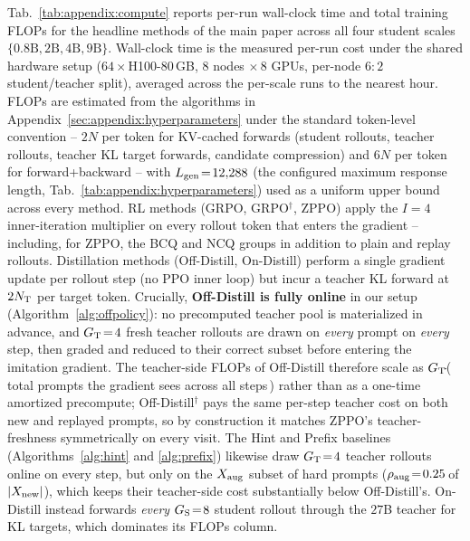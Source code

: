 \documentclass{llmxive}
\begin{document}
Tab.~\ref{tab:appendix:compute} reports per-run wall-clock time and total training FLOPs for the headline methods of the main paper across all four student scales $\{0.8\text{B},2\text{B},4\text{B},9\text{B}\}$. Wall-clock time is the measured per-run cost under the shared hardware setup ($64\!\times\!$H100-$80$\,GB, $8$ nodes $\times\,8$ GPUs, per-node $6\!:\!2$ student/teacher split), averaged across the per-scale runs to the nearest hour. FLOPs are estimated from the algorithms in Appendix~\ref{sec:appendix:hyperparameters} under the standard token-level convention -- $2N$ per token for KV-cached forwards (student rollouts, teacher rollouts, teacher KL target forwards, candidate compression) and $6N$ per token for forward+backward -- with $L_{\rm gen}\!=\!12{,}288$ (the configured maximum response length, Tab.~\ref{tab:appendix:hyperparameters}) used as a uniform upper bound across every method. RL methods (GRPO, GRPO$^{\dagger}$, ZPPO) apply the $I\!=\!4$ inner-iteration multiplier on every rollout token that enters the gradient -- including, for ZPPO, the BCQ and NCQ groups in addition to plain and replay rollouts. Distillation methods (Off-Distill, On-Distill) perform a single gradient update per rollout step (no PPO inner loop) but incur a teacher KL forward at $2N_{\rm T}$ per target token. Crucially, \textbf{Off-Distill is fully online} in our setup (Algorithm~\ref{alg:offpolicy}): no precomputed teacher pool is materialized in advance, and $G_{\rm T}\!=\!4$ fresh teacher rollouts are drawn on \emph{every} prompt on \emph{every} step, then graded and reduced to their correct subset before entering the imitation gradient. The teacher-side FLOPs of Off-Distill therefore scale as $G_{\rm T}\!\cdot\!$(\,total prompts the gradient sees across all steps\,) rather than as a one-time amortized precompute; Off-Distill$^{\dagger}$ pays the same per-step teacher cost on both new and replayed prompts, so by construction it matches ZPPO's teacher-freshness symmetrically on every visit. The Hint and Prefix baselines (Algorithms~\ref{alg:hint} and \ref{alg:prefix}) likewise draw $G_{\rm T}\!=\!4$ teacher rollouts online on every step, but only on the $X_{\rm aug}$ subset of hard prompts ($\rho_{\rm aug}\!=\!0.25\,$of $|X_{\rm new}|$), which keeps their teacher-side cost substantially below Off-Distill's. On-Distill instead forwards \emph{every} $G_{\rm S}\!=\!8$ student rollout through the $27$B teacher for KL targets, which dominates its FLOPs column.
\end{document}
